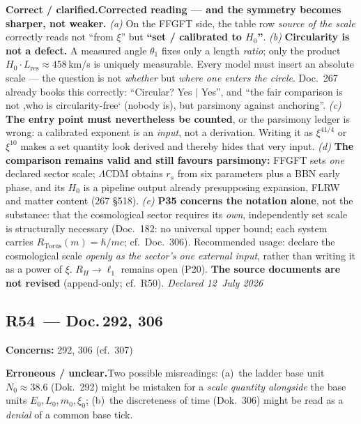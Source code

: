 \smallskip\noindent\textbf{Correct / clarified.}\quad \textbf{Corrected reading --- and the symmetry becomes sharper, not weaker.} \emph{(a)} On the FFGFT side, the table row \emph{source of the scale} correctly reads not \enquote{from $\xi$} but \textbf{\enquote{set / calibrated to $H_0$}}. \emph{(b)} \textbf{Circularity is not a defect.} A measured angle $\theta_1$ fixes only a length \emph{ratio}; only the product $H_0\cdot L_\text{res} \approx 458$\,km/s is uniquely measurable. Every model must insert an absolute scale --- the question is not \emph{whether} but \emph{where one enters the circle}. Doc.~267 already books this correctly: \enquote{Circular? Yes $|$ Yes}, and \enquote{the fair comparison is not ,who is circularity-free` (nobody is), but parsimony against anchoring}. \emph{(c)} \textbf{The entry point must nevertheless be counted}, or the parsimony ledger is wrong: a calibrated exponent is an \emph{input}, not a derivation. Writing it as $\xi^{41/4}$ or $\xi^{10}$ makes a set quantity look derived and thereby hides that very input. \emph{(d)} \textbf{The comparison remains valid and still favours parsimony:} FFGFT sets \emph{one} declared sector scale; $\Lambda$CDM obtains $r_s$ from six parameters plus a BBN early phase, and its $H_0$ is a pipeline output already presupposing expansion, FLRW and matter content (267 \S518). \emph{(e)} \textbf{P35 concerns the notation alone}, not the substance: that the cosmological sector requires its \emph{own}, independently set scale is structurally necessary (Doc.~182: no universal upper bound; each system carries $R_\text{Torus}(m)=\hbar/mc$; cf.\ Doc.~306). Recommended usage: declare the cosmological scale \emph{openly as the sector's one external input}, rather than writing it as a power of $\xi$. $R_H \to \ell_1$ remains open (P20). \textbf{The source documents are not revised} (append-only; cf.\ R50). \emph{Declared 12~July 2026}


\medskip


\subsection*{R54~--- Doc.\,292, 306}

\noindent\textbf{Concerns:} 292, 306 (cf.\ 307)


\smallskip\noindent\textbf{Erroneous / unclear.}\quad Two possible misreadings: (a)~the ladder base unit $N_0\approx38.6$ (Dok.~292) might be mistaken for a \emph{scale quantity alongside} the base units $E_0,L_0,m_0,\xi_0$; (b)~the discreteness of time (Dok.~306) might be read as a \emph{denial} of a common base tick.


